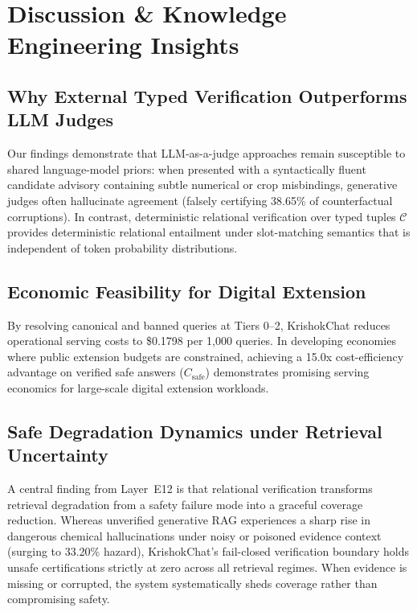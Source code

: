 \documentclass[11pt,a4paper]{article}
\begin{document}
\section{Discussion \& Knowledge Engineering Insights}
\label{sec:discussion}

\subsection{Why External Typed Verification Outperforms LLM Judges}
Our findings demonstrate that LLM-as-a-judge approaches remain susceptible to shared language-model priors: when presented with a syntactically fluent candidate advisory containing subtle numerical or crop misbindings, generative judges often hallucinate agreement (falsely certifying 38.65\% of counterfactual corruptions). In contrast, deterministic relational verification over typed tuples $\mathcal{C}$ provides deterministic relational entailment under slot-matching semantics that is independent of token probability distributions.

\subsection{Economic Feasibility for Digital Extension}
By resolving canonical and banned queries at Tiers 0--2, KrishokChat reduces operational serving costs to \$0.1798 per 1,000 queries. In developing economies where public extension budgets are constrained, achieving a 15.0x cost-efficiency advantage on verified safe answers ($C_{\text{safe}}$) demonstrates promising serving economics for large-scale digital extension workloads.

\subsection{Safe Degradation Dynamics under Retrieval Uncertainty}
A central finding from Layer~E12 is that relational verification transforms retrieval degradation from a safety failure mode into a graceful coverage reduction. Whereas unverified generative RAG experiences a sharp rise in dangerous chemical hallucinations under noisy or poisoned evidence context (surging to 33.20\% hazard), KrishokChat's fail-closed verification boundary holds unsafe certifications strictly at zero across all retrieval regimes. When evidence is missing or corrupted, the system systematically sheds coverage rather than compromising safety.


\end{document}
